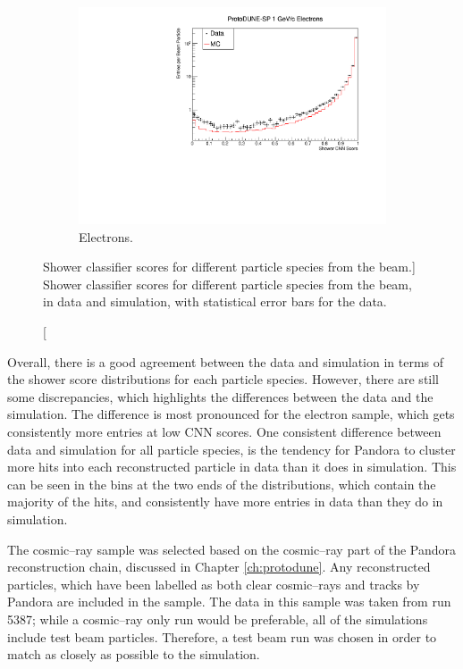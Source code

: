 \begin{figure}
	\begin{subfigure}[b]{0.68\textwidth}
		\centering
		\includegraphics[width=\textwidth]{figures/hit_cnn_electron.pdf}
		\caption {Electrons.}
		\label{fig:beam_electron_cnn}
	\end{subfigure}

	\caption
	[Shower classifier scores for different particle species from the \protodune{} 
	beam.]
	{Shower classifier scores for different particle species from the \protodune{} 
	beam, in data and simulation, with statistical error bars for the data.}
	\label{fig:cnn_scores_beam}

\end{figure}

Overall, there is a good agreement between the data and simulation in terms of
the shower score distributions for each particle species. However, there are
still some discrepancies, which highlights the differences between the data and
the simulation. The difference is most pronounced for the electron sample, which
gets consistently more entries at low CNN scores. One consistent difference
between data and simulation for all particle species, is the tendency for 
Pandora to cluster more hits into each reconstructed particle in data than it 
does in simulation. This can be seen in the bins at the two ends of the 
distributions, which contain the majority of the hits, and consistently have 
more entries in data than they do in simulation.

The cosmic--ray sample was selected based on the cosmic--ray part of the
Pandora reconstruction chain, discussed in Chapter \ref{ch:protodune}. Any
reconstructed particles, which have been labelled as both clear cosmic--rays
and tracks by Pandora are included in the sample. The data in this sample was
taken from run 5387; while a cosmic--ray only run would be preferable, all of 
the \protodune{} simulations include test beam particles. Therefore, a test beam
run was chosen in order to match as closely as possible to the simulation.

